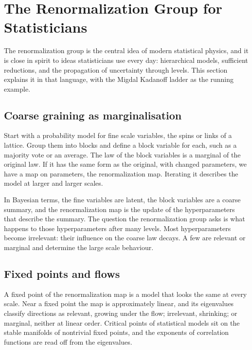 \section{The Renormalization Group for Statisticians}\label{ch:rg}

The renormalization group is the central idea of modern statistical physics, and it is close in spirit to ideas statisticians use every day: hierarchical models, sufficient reductions, and the propagation of uncertainty through levels. This section explains it in that language, with the Migdal Kadanoff ladder as the running example.

\subsection{Coarse graining as marginalisation}

Start with a probability model for fine scale variables, the spins or links of a lattice. Group them into blocks and define a block variable for each, such as a majority vote or an average. The law of the block variables is a marginal of the original law. If it has the same form as the original, with changed parameters, we have a map on parameters, the renormalization map. Iterating it describes the model at larger and larger scales.

In Bayesian terms, the fine variables are latent, the block variables are a coarse summary, and the renormalization map is the update of the hyperparameters that describe the summary. The question the renormalization group asks is what happens to those hyperparameters after many levels. Most hyperparameters become irrelevant: their influence on the coarse law decays. A few are relevant or marginal and determine the large scale behaviour.

\subsection{Fixed points and flows}

A fixed point of the renormalization map is a model that looks the same at every scale. Near a fixed point the map is approximately linear, and its eigenvalues classify directions as relevant, growing under the flow; irrelevant, shrinking; or marginal, neither at linear order. Critical points of statistical models sit on the stable manifolds of nontrivial fixed points, and the exponents of correlation functions are read off from the eigenvalues.

